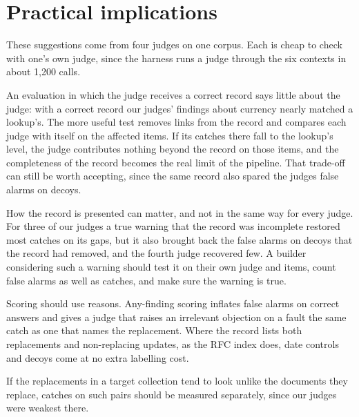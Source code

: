 \section{Practical implications}
\label{sec:guide}

These suggestions come from four judges on one corpus. Each is cheap to check with one's own judge, since the harness
runs a judge through the six contexts in about 1,200 calls.

An evaluation in which the judge receives a correct record says little about the judge: with a correct record our
judges' findings about currency nearly matched a lookup's. The more useful test removes links from the record and compares each judge with
itself on the affected items. If its catches there fall to the lookup's level, the judge contributes nothing beyond
the record on those items, and the completeness of the record becomes the real limit of the pipeline. That trade-off
can still be worth accepting, since the same record also spared the judges false alarms on decoys.

How the record is presented can matter, and not in the same way for every judge. For three of our judges a true
warning that the record was incomplete restored most catches on its gaps, but it also brought back the false alarms on
decoys that the record had removed, and the fourth judge recovered few. A builder considering such a warning should
test it on their own judge and items, count false alarms as well as catches, and make sure the warning is true.

Scoring should use reasons. Any-finding scoring inflates false alarms on correct answers and gives a judge that
raises an irrelevant objection on a fault the same catch as one that names the replacement. Where the record lists both replacements and
non-replacing updates, as the RFC index does, date controls and decoys come at no extra labelling cost.

If the replacements in a target collection tend to look unlike the documents they replace, catches on such pairs
should be measured separately, since our judges were weakest there.
